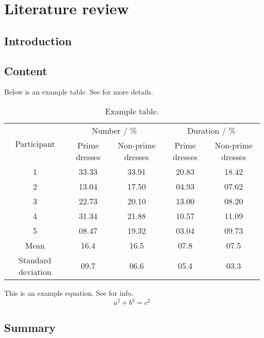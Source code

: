 \chapter{Literature review}

  \section{Introduction}
  \lipsum[1] 
  
  \section{Content}
  \lipsum[1-2] \cite{ref:jCAS09,ref:jCAS09a,ref:jCAS10} \lipsum[3-5] Below is an example table. See  for more details.
  \begin{table}
    \centering
    \caption{Example table.}
    \label{table:example_table}
    \begin{tabular}{ccccc}
      \toprule
      \multirow{2}{*}{Participant} & \multicolumn{2}{c}{Number / \%} & \multicolumn{2}{c}{Duration / \%} \\
                                   & Prime dresses & Non-prime dresses & Prime dresses & Non-prime dresses \\
	  \toprule
      1  & 33.33 & 33.91 & 20.83 & 18.42 \\
      2  & 13.04 & 17.50 & 04.93 & 07.62 \\
      3  & 22.73 & 20.10 & 13.00 & 08.20 \\
      4  & 31.34 & 21.88 & 10.57 & 11.09 \\
      5  & 08.47 & 19.32 & 03.04 & 09.73 \\
      \hline
      Mean & 16.4 & 16.5 & 07.8 & 07.5 \\
      Standard deviation & 09.7 & 06.6 & 05.4 & 03.3 \\
      \bottomrule
    \end{tabular}
  \end{table}  
  
  This is an example equation. See  for info.
  \begin{equation}
      a^{2} + b^{2} = c^{2} \label{equ:example}
  \end{equation}
  
  \section{Summary}
  \lipsum[6]
  
